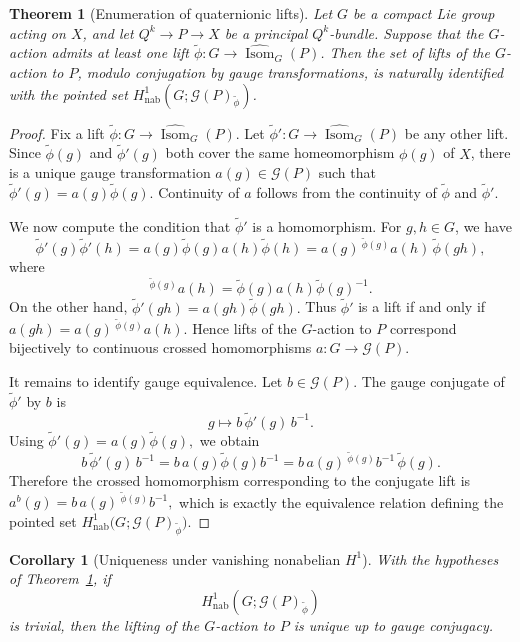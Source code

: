 \documentclass[11pt,a4paper]{article}
\numberwithin{equation}{section}
\newtheorem{thm}[definition]{Theorem}
\newtheorem{cor}[definition]{Corollary}
\theoremstyle{named}
\begin{document}
\begin{thm}[Enumeration of quaternionic lifts]
\label{thm:enumeration-global-liftings}
Let \(G\) be a compact Lie group acting on \(X\), and let $Q^k\longrightarrow P\longrightarrow X$
be a principal \(Q^k\)-bundle. Suppose that the \(G\)-action admits at least one lift $\widetilde\phi:G\longrightarrow \widehat{\operatorname{Isom}}_G(P)$.
Then the set of lifts of the \(G\)-action to \(P\), modulo conjugation by gauge transformations, is naturally identified with the pointed set $H^1_{\mathrm{nab}}(G;\mathcal G(P)_{\widetilde\phi})$.
\end{thm}
\begin{proof}
Fix a lift $\widetilde\phi:G\longrightarrow \widehat{\operatorname{Isom}}_G(P)$.
Let $\widetilde\phi':G\longrightarrow \widehat{\operatorname{Isom}}_G(P)$
be any other lift. Since \(\widetilde\phi(g)\) and \(\widetilde\phi'(g)\) both cover the same homeomorphism \(\phi(g)\) of \(X\), there is a unique gauge transformation $a(g)\in\mathcal G(P)$
such that $\widetilde\phi'(g)=a(g)\widetilde\phi(g)$.
Continuity of \(a\) follows from the continuity of \(\widetilde\phi\) and \(\widetilde\phi'\).

We now compute the condition that \(\widetilde\phi'\) is a homomorphism. For \(g,h\in G\), we have
\[
\widetilde\phi'(g)\widetilde\phi'(h)
=
a(g)\widetilde\phi(g)a(h)\widetilde\phi(h)
=
a(g)\,{}^{\widetilde\phi(g)}a(h)\,\widetilde\phi(gh),
\]
where
\[
{}^{\widetilde\phi(g)}a(h)
=
\widetilde\phi(g)a(h)\widetilde\phi(g)^{-1}.
\]
On the other hand, \(\widetilde\phi'(gh)=a(gh)\widetilde\phi(gh).\) Thus \(\widetilde\phi'\) is a lift if and only if \(a(gh)=a(g)\,{}^{\widetilde\phi(g)}a(h).\) Hence lifts of the \(G\)-action to \(P\) correspond bijectively to continuous crossed homomorphisms $a:G\longrightarrow\mathcal G(P)$.

It remains to identify gauge equivalence. Let \(b\in\mathcal G(P)\). The gauge conjugate of \(\widetilde\phi'\) by \(b\) is
\[
g\longmapsto b\,\widetilde\phi'(g)\,b^{-1}.
\]
Using \(\widetilde\phi'(g)=a(g)\widetilde\phi(g),\) we obtain \[b\,\widetilde\phi'(g)\,b^{-1} =b\,a(g)\widetilde\phi(g)b^{-1}=b\,a(g)\,{}^{\widetilde\phi(g)}b^{-1}\,\widetilde\phi(g).\] Therefore the crossed homomorphism corresponding to the conjugate lift is \(a^b(g)=b\,a(g)\,{}^{\widetilde\phi(g)}b^{-1},\) which is exactly the equivalence relation defining the pointed set $H^1_{\mathrm{nab}} \bigl(G;\mathcal G(P)_{\widetilde\phi}\bigr)$.
\end{proof}


\begin{cor}[Uniqueness under vanishing nonabelian $H^1$]
With the hypotheses of Theorem~\ref{thm:enumeration-global-liftings}, if
\[
H^1_{\mathrm{nab}}(G;\mathcal G(P)_{\widetilde\phi})
\]
is trivial, then the lifting of the $G$-action to $P$ is unique up to gauge conjugacy.
\end{cor}
\end{document}
